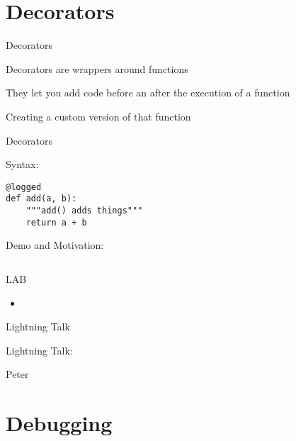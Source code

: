 \documentclass{beamer}
\begin{document}
\section{Decorators}

\begin{frame}[fragile]{Decorators}

{\LARGE Decorators are wrappers around functions}

\vfill
{\LARGE They let you add code before an after the execution of a function}

\vfill
{\LARGE Creating a custom version of that function}

\end{frame} 

\begin{frame}[fragile]{Decorators}

{\LARGE Syntax:}

\begin{verbatim}
@logged
def add(a, b):
    """add() adds things"""
    return a + b
\end{verbatim}

{\Large Demo and Motivation:}

\begin{verbatim}

\end{verbatim}

\end{frame} 


\begin{frame}{LAB}

\begin{itemize}
  \item
\end{itemize}

\end{frame}

\begin{frame}{Lightning Talk}

{\centering

\vfill
{\LARGE Lightning Talk:  }

\vfill
{\Huge Peter}

\vfill
}
\end{frame}


\section{Debugging}
\end{document}
